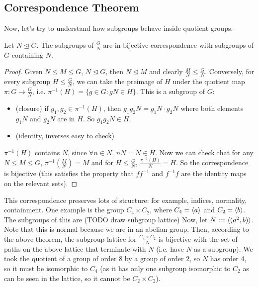 \documentclass{article}
\begin{document}
	\subsection{Correspondence Theorem}
	Now, let's try to understand how subgroups behave inside quotient groups.
	\begin{theorem}
		Let $N \trianglelefteq G$. The subgroups of $\frac{G}{N}$ are in bijective correspondence with subgroups of $G$ containing $N$.
	\end{theorem}
	\begin{proof}
		Given $N \leq M \leq G$, $N \trianglelefteq G$, then $N \trianglelefteq M$ and clearly $\frac{M}{N} \leq \frac{G}{N}$. Conversely, for every subgroup $H \leq \frac{G}{N}$, we can take the preimage of $H$ under the quotient map $\pi : G \to \frac{G}{N}$, i.e. $\pi^{-1}(H) = \{ g \in G : gN \in H \}$. This is a subgroup of $G$:
		\begin{itemize}
			\item (closure) if $g_1, g_2 \in \pi^{-1}(H)$, then $g_1g_2N = g_1N\cdot g_2N$ where both elements $g_1N$ and $g_2N$ are in $H$. So $g_1g_2N \in H$.
			\item (identity, inverses easy to check)
		\end{itemize}
		$\pi^{-1}(H)$ contains $N$, since $\forall n \in N$, $nN = N \in H$. Now we can check that for any $N \leq M \leq G$, $\pi^{-1}(\frac{M}{N}) = M$ and for $H \leq \frac{G}{N}$, $\frac{\pi^{-1}(H)}{N} = H$. So the correspondence is bijective (this satisfies the property that $ff^{-1}$ and $f^{-1}f$ are the identity maps on the relevant sets).
	\end{proof}
	This correspondence preserves lots of structure: for example, indices, normality, containment. One example is the group $C_4 \times C_2$, where $C_4 = \langle a \rangle$ and $C_2 = \langle b \rangle$. The subgroups of this are (TODO draw subgroup lattice)
	Now, let $N := \langle (a^2, b) \rangle$. Note that this is normal because we are in an abelian group. Then, according to the above theorem, the subgroup lattice for $\frac{C_4 \times C_2}{N}$ is bijective with the set of paths on the above lattice that terminate with $N$ (i.e. have $N$ as a subgroup).
	We took the quotient of a group of order 8 by a group of order 2, so $N$ has order 4, so it must be isomorphic to $C_4$ (as it has only one subgroup isomorphic to $C_2$ as can be seen in the lattice, so it cannot be $C_2 \times C_2$).
\end{document}
